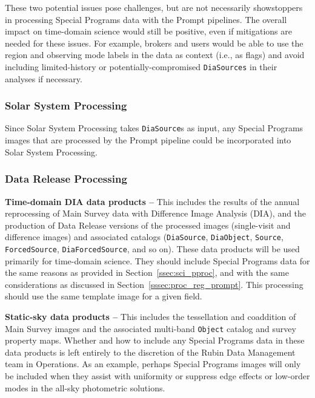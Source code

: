 These two potential issues pose challenges, but are not necessarily showstoppers 
in processing Special Programs data with the Prompt pipelines. 
The overall impact on time-domain science would still be positive, even 
if mitigations are needed for these issues.
For example, brokers and users would be able to use the region and observing mode 
labels in the data as context (i.e., as flags) and avoid including 
limited-history or potentially-compromised {\tt DiaSources} in their
analyses if necessary.

\subsubsection{Solar System Processing}\label{sssec:proc_reg_ss}

Since Solar System Processing takes {\tt DiaSource}s as input, any 
Special Programs images that are processed by the Prompt pipeline
could be incorporated into Solar System Processing.

\subsubsection{Data Release Processing}\label{sssec:proc_reg_dr}

\textbf{Time-domain DIA data products --}
This includes the results of the annual reprocessing of Main Survey data with 
Difference Image Analysis (DIA), and the production of Data Release
versions of the processed images (single-visit and difference images)
and associated catalogs ({\tt DiaSource}, {\tt DiaObject}, {\tt Source},
{\tt ForcedSource}, {\tt DiaForcedSource}, and so on).
These data products will be used primarily for time-domain science.
They should include Special Programs data for the same reasons as
provided in Section~\ref{ssec:sci_pproc}, and with the same 
considerations as discussed in Section~\ref{sssec:proc_reg_prompt}.
This processing should use the same template image for a given field.

\textbf{Static-sky data products --}
This includes the tessellation and coaddition of Main Survey images
and the associated multi-band {\tt Object} catalog and survey property maps.
Whether and how to include any Special Programs data in these data products
is left entirely to the discretion of the Rubin Data Management team in Operations.
As an example, perhaps Special Programs images will only be included when they 
assist with uniformity or suppress edge effects or low-order modes in the 
all-sky photometric solutions.

